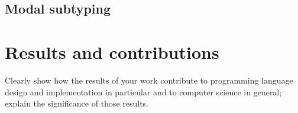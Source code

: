 \documentclass[sigplan,screen,dvipsnames]{acmart}
\newcommand\todo[1]{{\color{Purple}#1}}
\begin{document}
\subsection{Modal subtyping}


\section{Results and contributions}
\todo{Clearly show how the results of your work contribute to programming
  language design and implementation in particular and to computer science in
  general; explain the significance of those results.}






\end{document}
